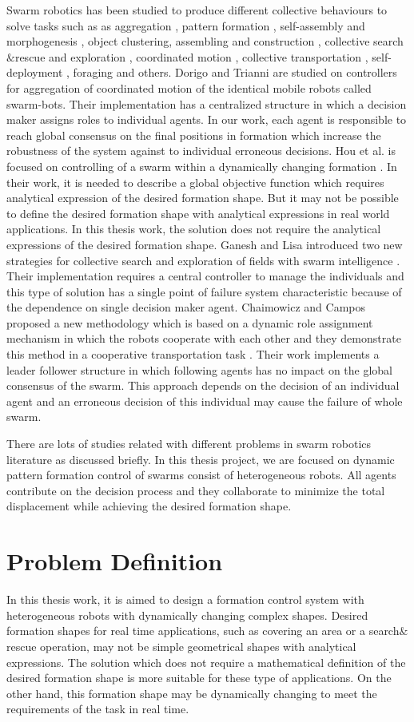 Swarm robotics has been studied to produce different collective behaviours to solve tasks such as as aggregation , pattern formation , self-assembly and morphogenesis , object clustering, assembling and construction , collective search$\&$rescue and exploration , coordinated motion , collective transportation , self-deployment , foraging and others\cite{5}. Dorigo and Trianni \cite{7} are studied on controllers for aggregation of coordinated motion of the identical mobile robots called swarm-bots. Their implementation has a centralized structure in which a decision maker assigns roles to individual agents. In our work, each agent is responsible to reach global consensus on the final positions in formation which increase the robustness of the system against to individual erroneous decisions. Hou et al. is focused on controlling of a swarm within a dynamically changing formation \cite{8}. In their work, it is needed to describe a global objective function which requires analytical expression of the desired formation shape. But it may not be possible to define the desired formation shape with analytical expressions in real world applications. In this thesis work, the solution does not require the analytical expressions of the desired formation shape.  Ganesh and Lisa introduced two new strategies for collective search and exploration of fields with swarm intelligence \cite{9}. Their implementation requires a central controller to manage the individuals and this type of solution has a single point of failure system characteristic because of the dependence on single decision maker agent.   Chaimowicz and Campos proposed a new methodology which is based on a dynamic role assignment mechanism in which the robots cooperate with each other and they demonstrate this method in a cooperative transportation task \cite{10}. Their work implements a leader follower structure in which following agents has no impact on the global consensus of the swarm. This approach depends on the decision of an individual agent and an erroneous decision of this individual may cause the failure of whole swarm. 

There are lots of studies related with different problems in swarm robotics literature as discussed briefly. In this thesis project, we are focused on dynamic pattern formation control of swarms consist of heterogeneous robots. All agents contribute on the decision process and they collaborate to minimize the total displacement while achieving the desired formation shape. 

\section{Problem Definition}
In this thesis work, it is aimed to design a formation control system with heterogeneous robots with dynamically changing complex shapes. Desired formation shapes for real time applications, such as covering an area or a search$\&$rescue operation, may not be simple geometrical shapes with analytical expressions. The solution which does not require a mathematical definition of the desired formation shape is more suitable for these type of applications. On the other hand, this formation shape may be dynamically changing to meet the requirements of the task in real time. 

